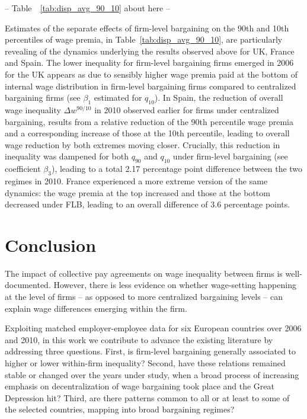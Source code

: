 \documentclass[Review,times,sageh,11pt]{sagej}
\begin{document}
\begin{center}
-- Table~~\ref{tab:disp_avg_90_10} about here --
\end{center}


Estimates of the separate effects of firm-level bargaining on the 90th and 10th percentiles of wage premia, in Table~\ref{tab:disp_avg_90_10}, are particularly revealing of the dynamics underlying the results observed above for UK, France and Spain. The lower inequality for firm-level bargaining firms emerged in 2006 for the UK appears as due to sensibly higher wage premia paid at the bottom of internal wage distribution in firm-level bargaining firms compared to centralized bargaining firms (see $\beta_1$ estimated for $q_{10}$). In Spain, the reduction of overall wage inequality $\Delta w^{90/10}$ in 2010 observed earlier for firms under centralized bargaining, results from a relative reduction of the 90th percentile wage premia and a corresponding increase of those at the 10th percentile, leading to overall wage reduction by both extremes moving closer.
Crucially, this reduction in inequality was dampened for both $q_{90}$ and $q_{10}$ under firm-level bargaining (see coefficient $\beta_3$), leading to a total 2.17 percentage point difference between the two regimes in 2010. France experienced a more extreme version of the same dynamics: the wage premia at the top increased and those at the bottom decreased under FLB, leading to an overall difference of 3.6 percentage points.

\section*{Conclusion}
\label{sec:conclusion}
The impact of collective pay agreements on wage inequality between firms is well-documented. However, there is less evidence on whether wage-setting happening at the level of firms -- as opposed to more centralized bargaining levels -- can explain wage differences emerging within the firm. 

Exploiting matched employer-employee data for six European countries over 2006 and 2010, in this work we contribute to advance the existing literature by addressing three questions. First, is firm-level bargaining generally associated to higher or lower within-firm inequality? Second, have these relations remained stable or changed over the years under study, when a broad process of increasing emphasis on decentralization of wage bargaining took place and the Great Depression hit? Third, are there patterns common to all or at least to some of the selected countries, mapping into broad bargaining regimes?
\end{document}
